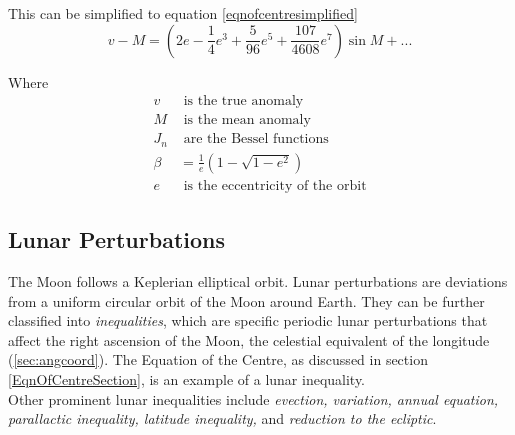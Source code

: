 \documentclass[fleqn,10pt]{olplainarticle}
\numberwithin{equation}{subsection}
\begin{document}
This can be simplified to equation \ref{eqnofcentresimplified}\\
\begin{equation}\label{eqnofcentresimplified}
v - M = \left(2e - \frac{1}{4}e^3 + \frac{5}{96}e^5 + \frac{107}{4608}e^7\right) \sin{M}  + ...
\end{equation}

Where
\begin{align*}
    v & \text{ is the true anomaly}\\
    M & \text{ is the mean anomaly}\\
    J_n & \text{ are the Bessel functions} \\
    \beta &= \frac{1}{e}\left(1 - \sqrt{1 - e^2}\right) \\
    e & \text{ is the eccentricity of the orbit}
\end{align*}



\subsection{Lunar Perturbations}\label{sec:lunpert}

The Moon follows a Keplerian elliptical orbit. Lunar perturbations are deviations from a uniform circular orbit of the Moon around Earth. They can be further classified into \emph{inequalities}, which are specific periodic lunar perturbations that affect the right ascension of the Moon, the celestial equivalent of the longitude (\ref{sec:angcoord}). The Equation of the Centre, as discussed in section \ref{EqnOfCentreSection}, is an example of a lunar inequality.\\
Other prominent lunar inequalities include \emph{evection, variation, annual equation, parallactic inequality, latitude inequality,} and \emph{reduction to the ecliptic}.
\end{document}
